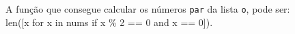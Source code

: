 \documentclass[12pt,varwidth=16cm,border=1pt]{standalone}
\begin{document}
A função que consegue calcular os números \verb+par+ da lista \verb+o+, pode ser: \\ len([x for x in nums if x \% 2 == 0 and x == 0]).

\questiomfalse
\end{document}
